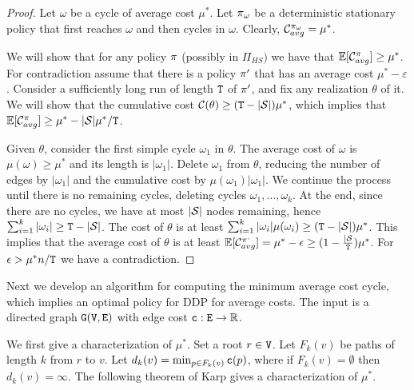 \begin{proof}
Let $\omega$ be a cycle of average cost $\mu^*$. Let
$\pi_{\omega}$ be a deterministic stationary policy that first
reaches $\omega$ and then cycles in $\omega$. Clearly,
$\mathcal{C}^{\pi_\omega}_{avg}=\mu^*$.

We will show that for any policy $\pi$ (possibly in $\Pi_{HS})$ we
have that $\mathbb{E}[\mathcal{C}^\pi_{avg}]\geq \mu^*$. For contradiction
assume that there is a policy $\pi'$ that has an average cost
$\mu^*-\varepsilon$. Consider a sufficiently long run of length
${\tt T}$ of $\pi'$, and fix any realization $\theta$ of it.
We will show that the cumulative cost $\mathcal{C}(\theta)\geq
({\tt T}-|\mathcal{S}|)\mu^*$, which implies that $\mathbb{E}[\mathcal{C}^\pi_{avg}]\geq
\mu^* -|\mathcal{S}|\mu^*/{\tt T}$.

Given $\theta$, consider the first simple cycle $\omega_1$ in
$\theta$. The average cost of $\omega$ is $\mu(\omega)\geq\mu^*$ and its length is $|\omega_1|$.
Delete $\omega_1$ from $\theta$, reducing the number of edges by
$|\omega_1|$ and the cumulative cost by $\mu(\omega_1)|\omega_1|$. We
continue the process until there is no remaining cycles, deleting cycles $\omega_1, \ldots , \omega_k$. At the end, since there are no cycles, we have at most $|\mathcal{S}|$ nodes remaining, hence $\sum_{i=1}^k |\omega_i|\geq {\tt T}-|\mathcal{S}|$. The cost of $\theta$ is at least $\sum_{i=1}^k |\omega_i|\mu(\omega_i)\geq({\tt T}-|\mathcal{S}|)\mu^*$.
This implies that the average cost of $\theta$ is at least $\mathbb{E}[\mathcal{C}_{avg}^{\pi^{,}}]=\mu^*-\epsilon\geq
(1-\frac{|\mathcal{S}}{{\tt T}})\mu^*$. For $\epsilon>\mu^* n/{\tt T}$ we
have a contradiction.
\end{proof}

Next we develop an algorithm for computing the minimum average cost
cycle, which implies an optimal policy for DDP for average costs.
The input is a directed graph ${\tt G}({\tt V},{\tt E})$ with edge cost ${\tt c}:{\tt E}\rightarrow {\mathbb R}$.

We first give a characterization of $\mu^*$. Set a root $r\in {\tt V}$.
Let $F_{k}(v)$ be paths of length $k$ from $r$ to $v$. Let
$d_{k}(v)=\min_{p\in F_{k}(v)} {\tt c}(p)$, where if
$F_{k}(v)=\emptyset$ then $d_{k}(v)=\infty$. The following theorem of Karp \cite{Karp78}
gives a characterization of $\mu^*$.

